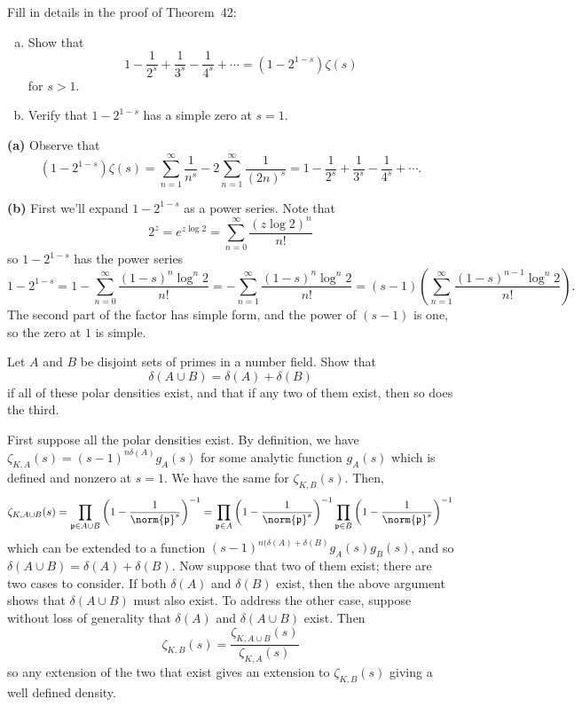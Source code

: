 \documentclass[11pt,letterpaper]{article}
\begin{document}
\begin{cproblem}{7.1}
    Fill in details in the proof of Theorem~42:
    \begin{enumerate}[(a)]
        \item Show that
        \[
            1-\frac{1}{2^s}+\frac{1}{3^s}-\frac{1}{4^s}+\cdots=(1-2^{1-s})\zeta(s)
        \] 
        for $s>1$.
        \item Verify that $1-2^{1-s}$ has a simple zero at $s=1$.
    \end{enumerate}
\end{cproblem}

\begin{solution}
    \textbf{(a)} Observe that
    \[
        (1-2^{1-s})\zeta(s)=\sum^\infty_{n=1}\frac{1}{n^s}-2\sum^\infty_{n=1}\frac{1}{(2n)^s} = 1-\frac{1}{2^s}+\frac{1}{3^s}-\frac{1}{4^s}+\cdots
    .\] 

    \textbf{(b)} First we'll expand $1-2^{1-s}$ as a power series. Note that
    \[
        2^z = e^{z\log 2} = \sum_{n=0}^\infty \frac{(z\log 2)^n}{n!}
    \] 
    so $1-2^{1-s}$ has the power series
    \[
        1-2^{1-s} = 1-\sum_{n=0}^\infty \frac{(1-s)^n \log^n 2}{n!}= -\sum_{n=1}^\infty \frac{(1-s)^n\log^n 2}{n!} = (s-1)\left(\sum_{n=1}^\infty \frac{(1-s)^{n-1}\log^n 2}{n!}\right)
    .\]
    The second part of the factor has simple form, and the power of $(s-1)$ is one, so the zero at $1$ is simple.
\end{solution}

\begin{cproblem}{7.3}
    Let $A$ and $B$ be disjoint sets of primes in a number field. Show that 
    \[
        \delta(A\cup B) = \delta(A) + \delta(B)
    \]
    if all of these polar densities exist, and that if any two of them exist, then so does the third.
\end{cproblem}

\begin{solution}
    First suppose all the polar densities exist. By definition, we have $\zeta_{K,A}(s)=(s-1)^{n\delta(A)}g_A(s)$ for some analytic function $g_A(s)$ which is defined and nonzero at $s=1$. We have the same for $\zeta_{K,B}(s)$. Then,
    \[
        \zeta_{K, A\cup B}(s) = \prod_{\mathfrak{p}\in A\cup B}\left(1-\frac{1}{\norm{\mathfrak{p}}^s}\right)^{-1} = \prod_{\mathfrak{p}\in A}\left(1-\frac{1}{\norm{\mathfrak{p}}^s}\right)^{-1}\prod_{\mathfrak{p}\in B}\left(1-\frac{1}{\norm{\mathfrak{p}}^s}\right)^{-1} 
    \]
    which can be extended to a function $(s-1)^{n(\delta(A)+\delta(B)}g_A(s)g_B(s)$, and so $\delta(A\cup B)=\delta(A)+\delta(B)$. Now suppose that two of them exist; there are two cases to consider. If both $\delta(A)$ and $\delta(B)$ exist, then the above argument shows that $\delta(A\cup B)$ must also exist. To address the other case, suppose without loss of generality that $\delta(A)$ and $\delta(A\cup B)$ exist. Then
    \[
        \zeta_{K, B}(s) = \frac{\zeta_{K, A\cup B}(s)}{\zeta_{K, A}(s)}
    \]
    so any extension of the two that exist gives an extension to $\zeta_{K, B}(s)$ giving a well defined density.

\end{solution}
\end{document}
